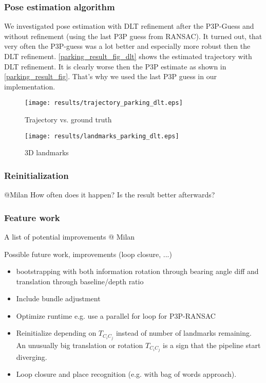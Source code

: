 \subsubsection{Pose estimation algorithm}
We investigated pose estimation with DLT refinement after the P3P-Guess and without refinement (using the last P3P guess from RANSAC). It turned out, that very often the P3P-guess was a lot better and especially more robust then the DLT refinement. \cref{parking_result_fig_dlt} shows the estimated trajectory with DLT refinement. It is clearly worse then the P3P estimate as shown in \cref{parking_result_fig}. That's why we used the last P3P guess in our implementation.
\begin{figure*}[ht!]
    \centering
    \begin{subfigure}[t]{0.5\textwidth}
        \centering
        \texttt{[image: results/trajectory\_parking\_dlt.eps]} 
        \caption{Trajectory vs. ground truth}
    \end{subfigure} 
    \begin{subfigure}[t]{0.5\textwidth}
        \centering
        \texttt{[image: results/landmarks\_parking\_dlt.eps]}
        \caption{3D landmarks}
    \end{subfigure}
    \caption{Parking dataset results with DLT refinement}
		\label{parking_result_fig_dlt}
\end{figure*}

\subsubsection{Reinitialization}
\textcolor[rgb]{1,0,0}{@Milan}
How often does it happen? Is the result better afterwards?

\subsubsection{Feature work}
A list of potential improvements
\textcolor[rgb]{1,0,0}{@ Milan}

Possible future work, improvements (loop closure, ...)

\begin{itemize}
\item \colorbox[rgb]{1,0,0}{bootstrapping with both information rotation through bearing angle diff and translation through baseline/depth ratio}
\item Include bundle adjustment
\item Optimize runtime e.g. use a parallel for loop for P3P-RANSAC
\item Reinitialize depending on $T_{C_iC_j}$ instead of number of landmarks remaining. An unusually big translation or rotation $T_{C_iC_j}$ is a sign that the pipeline start diverging.
\item Loop closure and place recognition (e.g. with bag of words approach).
\end{itemize}
